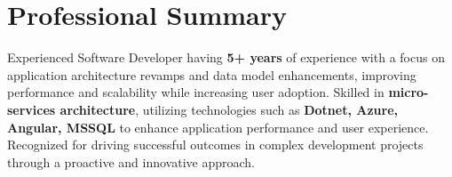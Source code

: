 \section{\textbf{Professional Summary}}
\begin{itemize}[leftmargin=0.15in, label={}]
    \small{\item{
          Experienced Software Developer having \textbf{5+ years} of experience with a focus on
          application architecture revamps and data model enhancements, improving
          performance and scalability while increasing user adoption.
          Skilled in \textbf{micro-services architecture}, utilizing technologies such as \textbf{Dotnet, Azure, Angular, MSSQL} to enhance application performance and user experience.
          Recognized for driving successful outcomes in complex development projects through a
          proactive and innovative approach.
          }}
\end{itemize}
